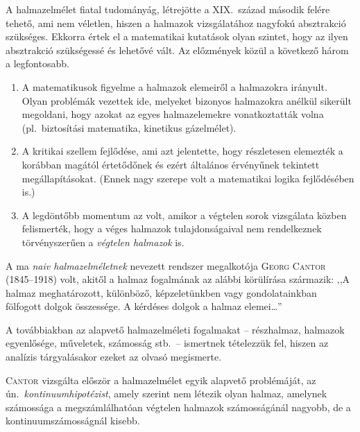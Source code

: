 \documentclass[a4paper,12pt]{article}
\begin{document}
	A halmazelmélet fiatal tudományág, létrejötte a XIX.~század második
	felére tehető, ami nem véletlen, hiszen a halmazok vizsgálatához nagyfokú
	absztrakció szükséges. Ekkorra értek el a matematikai kutatások olyan szintet, hogy az ilyen absztrakció szükségessé és lehetővé vált. Az előzmények
	közül a következő három a legfontosabb.
	\begin{enumerate}
		\item A matematikusok figyelme a halmazok elemeiről a halmazokra irányult.
		Olyan problémák vezettek ide, melyeket bizonyos halmazokra anélkül
		sikerült megoldani, hogy azokat az egyes halmazelemekre vonatkoztatták volna (pl.~biztosítási matematika, kinetikus gázelmélet).
		\item A kritikai szellem fejlődése, ami azt jelentette, hogy részletesen elemezték a korábban magától értetődőnek és ezért általános érvényűnek
		tekintett megállapításokat. (Ennek nagy szerepe volt a matematikai
		logika fejlődésében is.)
		\item A legdöntőbb momentum az volt, amikor a végtelen sorok vizsgálata
		közben felismerték, hogy a véges halmazok tulajdonságaival nem rendelkeznek törvényszerűen a \emph{végtelen halmazok} is.
	\end{enumerate}

	A ma \emph{naiv halmazelméletnek} nevezett rendszer megalkotója \textsc{Georg Cantor} (1845--1918) volt, akitől a halmaz fogalmának az alábbi körülírása származik: ,,A halmaz meghatározott, különböző, képzeletünkben vagy gondolatainkban fölfogott dolgok összessége. A kérdéses dolgok a halmaz elemei\dots''
	
	A továbbiakban az alapvető halmazelméleti fogalmakat -- részhalmaz, halmazok egyenlősége, műveletek, számosság stb.~-- ismertnek tételezzük fel, hiszen az analízis tárgyalásakor ezeket az olvasó megismerte.
	
	\textsc{Cantor} vizsgálta először a halmazelmélet egyik alapvető problémáját, az
	ún.~\emph{kontinuumhipotézist}, amely szerint nem létezik olyan halmaz, amelynek
	számossága a megszámlálhatóan végtelen halmazok számosságánál nagyobb,
	de a kontinuumszámosságnál kisebb.
	
\end{document}
